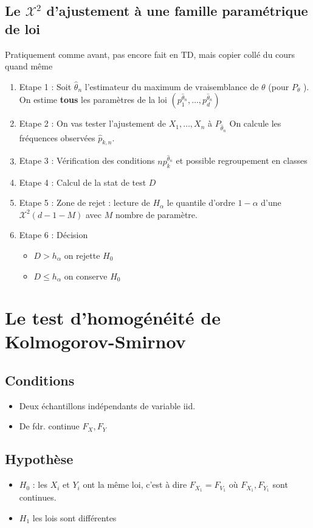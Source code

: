 \documentclass{article}
\theoremstyle{plain}%
\theoremstyle{definition}
\theoremstyle{remark}
\begin{document}
\subsection{Le $ \mathcal{X}^2 $ d'ajustement à une famille paramétrique de loi}
Pratiquement comme avant, pas encore fait en TD, mais copier collé du cours quand même 
\begin{enumerate}
    \item Etape 1 : Soit $ \hat{\theta }_n $ l'estimateur du maximum de vraisemblance de $ \theta  $ (pour $ P_\theta  $ ). On estime \textbf{tous} les paramètres de la loi $ (p_1^{\hat{\theta }_n}, \dots, p_d^{\hat{\theta }_n}) $ 
    \item Etape 2 : On vas tester l'ajustement de $ X_1, \dots, X_n $ à $ P_{\hat{\theta }_n} $ On calcule les fréquences observées $ \hat{p}_{k,n} $.
    \item Etape 3 : Vérification des conditions $ np_k^{\hat{\theta }_n} $ et possible regroupement en classes 
    \item Etape 4 : Calcul de la stat de test $ D $ 
    \item Etape 5 : Zone de rejet : lecture de $ H_\alpha  $ le quantile d'ordre $ 1-\alpha  $ d'une $ \mathcal{X}^2(d-1-M) $ avec $ M $ nombre de paramètre. 
    \item Etape 6 : Décision 
        \begin{itemize}
            \item $ D > h_\alpha  $ on rejette $ H_0 $ 
            \item $ D \leq h_\alpha  $ on conserve $ H_0 $ 
        \end{itemize}
\end{enumerate}


\section{Le test d'homogénéité de Kolmogorov-Smirnov}
\subsection*{Conditions}
\begin{itemize}
    \item Deux échantillons indépendants de variable iid.
    \item De fdr. continue $ F_X, F_Y $ 
\end{itemize}

\subsection*{Hypothèse}
\begin{itemize}
    \item $ H_0 $ : les $ X_i $ et $ Y_i $ ont la même loi, c'est à dire $ F_{X_1} = F_{V_1} $ où $ F_{X_1}, F_{Y_1} $ sont continues.
    \item $ H_1 $ les lois sont différentes
\end{itemize}
\end{document}
